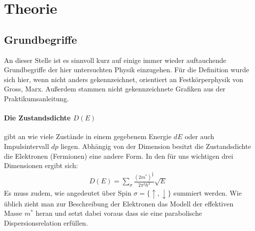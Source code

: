 \documentclass[twoside,        %
               BCOR12mm,       %
               english,ngerman, %
               fleqn,headsepline=false,footsepline=false
              ]{MFPREPORT}
\begin{document}
\section{Theorie}

\subsection{Grundbegriffe}
An dieser Stelle ist es sinnvoll kurz auf
einige immer wieder auftauchende Grundbegriffe der hier untersuchten Physik einzugehen. Für die Definition wurde sich hier, wenn nicht anders gekennzeichnet, orientiert an Festkörperphysik von Gross, Marx.
Außerdem stammen nicht gekennzeichnete Grafiken aus der Praktikumsanleitung.



\paragraph{Die Zustandsdichte $D(E)$} gibt an wie viele Zustände in einem gegebenem Energie $dE$ oder auch Impulsintervall $d p$ liegen.
Abhängig von der Dimension besitzt die Zustandsdichte die Elektronen (Fermionen) eine andere Form. 
In den für uns wichtigen drei Dimensionen ergibt sich:
\begin{align}
D(E) = \sum_{\sigma} \frac{(2m^{*})^{\frac{3}{2}}}{2 \pi^2 \hbar^3} \sqrt{E}
\end{align}
Es muss zudem, wie angedeutet über Spin $\sigma=\lbrace \uparrow, \downarrow \rbrace$ summiert werden.
Wie üblich zieht man zur Beschreibung der Elektronen das Modell der effektiven Masse $m^{*}$ heran und setzt dabei voraus dass sie eine parabolische Dispersionsrelation erfüllen.
\\
\end{document}
